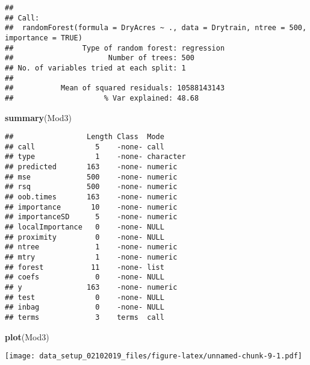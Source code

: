 \documentclass[]{article}
\newenvironment{Shaded}{\begin{snugshade}}{\end{snugshade}}
\newcommand{\KeywordTok}[1]{\textcolor[rgb]{0.13,0.29,0.53}{\textbf{{#1}}}}
\newcommand{\DataTypeTok}[1]{\textcolor[rgb]{0.13,0.29,0.53}{{#1}}}
\newcommand{\StringTok}[1]{\textcolor[rgb]{0.31,0.60,0.02}{{#1}}}
\newcommand{\CommentTok}[1]{\textcolor[rgb]{0.56,0.35,0.01}{\textit{{#1}}}}
\newcommand{\NormalTok}[1]{{#1}}
\begin{document}
\begin{verbatim}
## 
## Call:
##  randomForest(formula = DryAcres ~ ., data = Drytrain, ntree = 500,      importance = TRUE) 
##                Type of random forest: regression
##                      Number of trees: 500
## No. of variables tried at each split: 1
## 
##           Mean of squared residuals: 10588143143
##                     % Var explained: 48.68
\end{verbatim}

\begin{Shaded}
\begin{Highlighting}[]
\KeywordTok{summary}\NormalTok{(Mod3)}
\end{Highlighting}
\end{Shaded}

\begin{verbatim}
##                 Length Class  Mode     
## call              5    -none- call     
## type              1    -none- character
## predicted       163    -none- numeric  
## mse             500    -none- numeric  
## rsq             500    -none- numeric  
## oob.times       163    -none- numeric  
## importance       10    -none- numeric  
## importanceSD      5    -none- numeric  
## localImportance   0    -none- NULL     
## proximity         0    -none- NULL     
## ntree             1    -none- numeric  
## mtry              1    -none- numeric  
## forest           11    -none- list     
## coefs             0    -none- NULL     
## y               163    -none- numeric  
## test              0    -none- NULL     
## inbag             0    -none- NULL     
## terms             3    terms  call
\end{verbatim}

\begin{Shaded}
\begin{Highlighting}[]
\KeywordTok{plot}\NormalTok{(Mod3)}
\end{Highlighting}
\end{Shaded}

\texttt{[image: data\_setup\_02102019\_files/figure-latex/unnamed-chunk-9-1.pdf]}

\begin{Shaded}
\end{Shaded}
\end{document}
